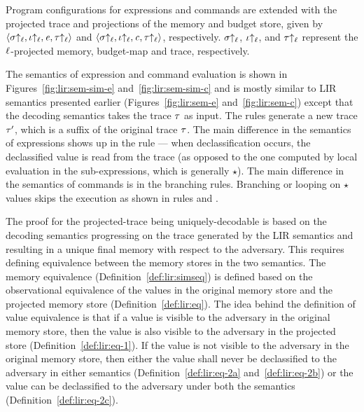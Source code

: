 Program configurations for expressions and commands are extended with
the projected trace and projections of the memory and budget store,
given by $\langle \sigma{\uparrow_\ell}, \iota{\uparrow_\ell}, \mathit{e}, \tau{\uparrow_\ell} \rangle$
and $\langle \sigma{\uparrow_\ell}, \iota{\uparrow_\ell}, \mathit{c}, \tau{\uparrow_\ell} \rangle$,
respectively. $\sigma{\uparrow_\ell}$, $\iota{\uparrow_\ell}$, and $\tau{\uparrow_\ell}$
represent the $\ell$-projected memory, budget-map and trace,
respectively.  

The semantics of expression and command evaluation is shown in
Figures~\ref{fig:lir:sem-sim-e} and~\ref{fig:lir:sem-sim-c} and is
mostly similar to LIR semantics presented earlier
(Figures~\ref{fig:lir:sem-e} and~\ref{fig:lir:sem-c}) except that the
decoding semantics takes the trace  $\tau$ as input. The rules
generate a new trace $\tau'$, which is a suffix of the original
trace $\tau$. The  main difference in the semantics of expressions
shows up in the  rule --- when declassification
occurs, the  declassified value is read from the trace (as opposed to
the one computed by local evaluation in the sub-expressions, which is
generally $\star$). The main difference in the semantics of commands
is in the branching rules. Branching or looping on $\star$ values
skips the execution as shown in rules  and
.  

The proof for the projected-trace being uniquely-decodable is based on the
decoding semantics progressing on the trace generated by the LIR
semantics and resulting in a unique final memory with respect to the 
adversary. This requires defining equivalence between the memory 
stores in the two semantics. The memory equivalence
(Definition~\ref{def:lir:simseq}) is defined based on the 
observational equivalence of the values in the original memory store and 
the projected memory store (Definition~\ref{def:lir:eq}). 
The idea behind the definition of value equivalence is that if a value is 
visible to the adversary in the original memory store, then the value is 
also visible to the adversary in the projected store 
(Definition~\ref{def:lir:eq-1}). If the value is not visible to the 
adversary in the original memory store, then either the value shall never 
be declassified to the adversary in either semantics 
(Definition~\ref{def:lir:eq-2a} and~\ref{def:lir:eq-2b}) or the value can 
be declassified to the adversary under both the semantics 
(Definition~\ref{def:lir:eq-2c}). 

